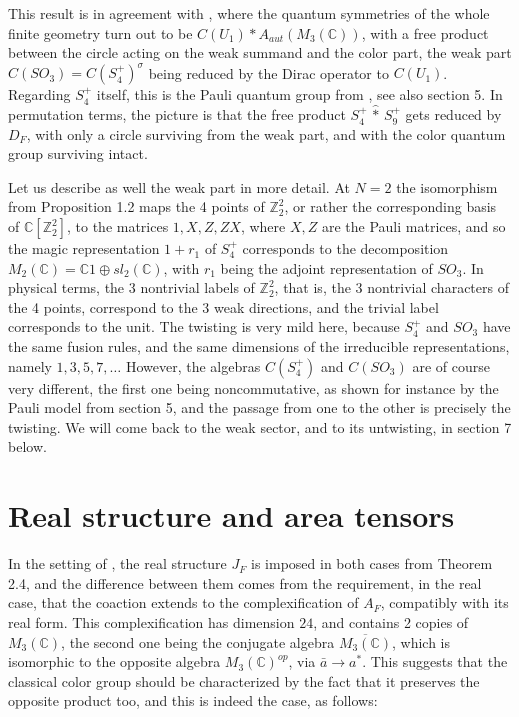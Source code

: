 \documentclass[11pt]{amsart}
\theoremstyle{definition}
\begin{document}
This result is in agreement with \cite{bdd}, where the quantum symmetries of the whole finite geometry turn out to be $C(U_1)*A_{aut}(M_3(\mathbb C))$, with a free product between the circle acting on the weak summand and the color part, the weak part $C(SO_3)=C(S_4^+)^\sigma$ being reduced by the Dirac operator to $C(U_1)$. Regarding $S_4^+$ itself, this is the Pauli quantum group from \cite{bcp}, see also section 5. In permutation terms, the picture is that the free product $S_4^+\,\hat{*}\,S_9^+$ gets reduced by $D_F$, with only a circle surviving from the weak part, and with the color quantum group surviving intact.

Let us describe as well the weak part in more detail. At $N=2$ the isomorphism from Proposition 1.2 maps the 4 points of $\mathbb Z_2^2$, or rather the corresponding basis of $\mathbb C[\mathbb Z_2^2]$, to the matrices $1,X,Z,ZX$, where $X,Z$ are the Pauli matrices, and so the magic representation $1+r_1$ of $S_4^+$ corresponds to the decomposition $M_2(\mathbb C)=\mathbb C1\oplus sl_2(\mathbb C)$, with $r_1$ being the adjoint representation of $SO_3$. In physical terms, the 3 nontrivial labels of $\mathbb Z_2^2$, that is, the 3 nontrivial characters of the 4 points, correspond to the 3 weak directions, and the trivial label corresponds to the unit. The twisting is very mild here, because $S_4^+$ and $SO_3$ have the same fusion rules, and the same dimensions of the irreducible representations, namely $1,3,5,7,\ldots$ However, the algebras $C(S_4^+)$ and $C(SO_3)$ are of course very different, the first one being noncommutative, as shown for instance by the Pauli model from section 5, and the passage from one to the other is precisely the twisting. We will come back to the weak sector, and to its untwisting, in section 7 below.

\section{Real structure and area tensors}

In the setting of \cite{bdd}, the real structure $J_F$ is imposed in both cases from Theorem 2.4, and the difference between them comes from the requirement, in the real case, that the coaction extends to the complexification of $A_F$, compatibly with its real form. This complexification has dimension $24$, and contains 2 copies of $M_3(\mathbb C)$, the second one being the conjugate algebra $\overline{M_3(\mathbb C)}$, which is isomorphic to the opposite algebra $M_3(\mathbb C)^{op}$, via $\bar{a}\to a^*$. This suggests that the classical color group should be characterized by the fact that it preserves the opposite product too, and this is indeed the case, as follows:
\end{document}

